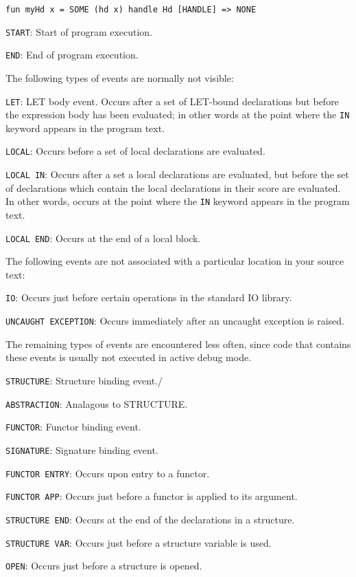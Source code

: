 \begin{verbatim}
fun myHd x = SOME (hd x) handle Hd [HANDLE] => NONE
\end{verbatim}

\verb'START': Start of program execution.

\verb'END': End of program execution.

The following types of events are normally not visible:

\verb'LET': LET body event.  Occurs after a set of LET-bound declarations
but before the expression body has been evaluated; in other words at the 
point where the \verb'IN' keyword appears in the program text.

\verb'LOCAL': Occurs before a set of local declarations are evaluated.

\verb'LOCAL IN': Occurs after a set a local declarations are evaluated,
but before the set of declarations which contain the local
declarations in their score are evaluated.  In other words, occurs at
the point where the \verb'IN' keyword appears in the program text.

\verb'LOCAL END': Occurs at the end of a local block.

The following events are not associated with a particular location in
your source text:

\verb'IO': Occurs just before certain operations in the standard IO
library.

\verb'UNCAUGHT EXCEPTION': Occurs immediately after an uncaught exception
is raised.

The remaining types of events are encountered less often, since code
that contains these events is usually not executed in active debug mode.

\verb'STRUCTURE': Structure binding event./

\verb'ABSTRACTION': Analagous to STRUCTURE.

\verb'FUNCTOR': Functor binding event.

\verb'SIGNATURE': Signature binding event.

\verb'FUNCTOR ENTRY': Occurs upon entry to a functor.

\verb'FUNCTOR APP': Occurs just before a functor is applied to its
argument.

\verb'STRUCTURE END': Occurs at the end of the declarations in a
structure.

\verb'STRUCTURE VAR': Occurs just before a structure variable is used.

\verb'OPEN': Occurs just before a structure is opened.

